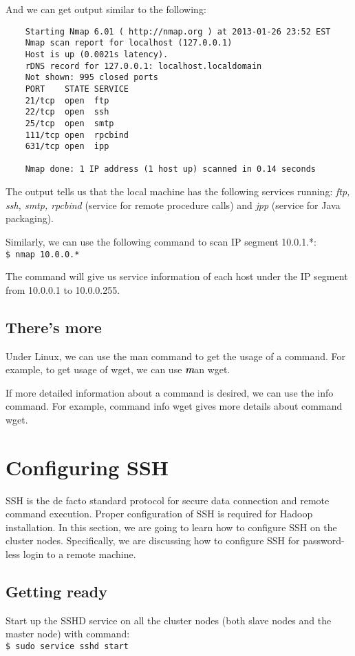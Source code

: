 And we can get output similar to the following:
\begin{verbatim}
    Starting Nmap 6.01 ( http://nmap.org ) at 2013-01-26 23:52 EST
    Nmap scan report for localhost (127.0.0.1)
    Host is up (0.0021s latency).
    rDNS record for 127.0.0.1: localhost.localdomain
    Not shown: 995 closed ports
    PORT    STATE SERVICE
    21/tcp  open  ftp
    22/tcp  open  ssh
    25/tcp  open  smtp
    111/tcp open  rpcbind
    631/tcp open  ipp
    
    Nmap done: 1 IP address (1 host up) scanned in 0.14 seconds
\end{verbatim}

The output tells us that the local machine has the following services running: \emph{ftp, ssh, smtp, rpcbind} (service for remote procedure calls) and \emph{jpp} (service for Java packaging).

Similarly, we can use the following command to scan IP segment 10.0.1.*: \\
\verb|$ nmap 10.0.0.*|

The command will give us service information of each host under the IP segment from 10.0.0.1 to 10.0.0.255.

\subsection*{There's more}
Under Linux, we can use the man command to get the usage of a command. For example, to get usage of wget, we can use {\emph \textbf man wget}.

If more detailed information about a command is desired, we can use the info command. For example, command info wget gives more details about command wget.

\section{Configuring SSH}
SSH is the de facto standard protocol for secure data connection and remote command execution. Proper configuration of SSH is required for Hadoop installation. In this section, we are going to learn how to configure SSH on the cluster nodes. Specifically, we are discussing how to configure SSH for password-less login to a remote machine.

\subsection*{Getting ready}
Start up the SSHD service on all the cluster nodes (both slave nodes and the master node) with command: \\
\verb|$ sudo service sshd start|

